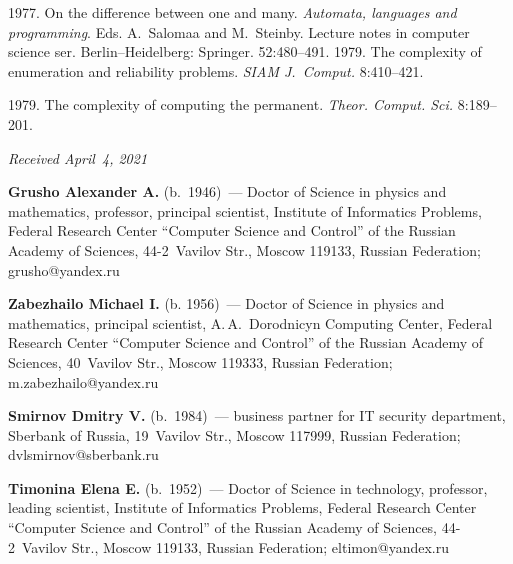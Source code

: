 \begin{multicols}{2}
{{\begin{thebibliography}{99}
\pagebreak


 1977. On the difference between one and many. \textit{Automata, 
languages and programming}. Eds. A.~Salomaa and M.~Steinby. Lecture notes in computer science 
ser. Berlin--Heidelberg: Springer. 52:480--491.
 1979. The complexity of enumeration and reliability problems. \textit{SIAM 
J.~Comput.} 8:410--421.

\vspace*{-2pt}

 1979. The complexity of computing the permanent. \textit{Theor. Comput. Sci.} 
8:189--201.

 \end{thebibliography}

 }
 }

\end{multicols}

\vspace*{-3pt}

  \hfill{\small\textit{Received April~4, 2021}}



   

\Contr

\noindent
\textbf{Grusho Alexander A.} (b.\ 1946)~--- Doctor of Science in physics and mathematics, 
professor, principal scientist, Institute of Informatics Problems, Federal Research Center 
``Computer Science and Control'' of the Russian Academy of Sciences, 44-2~Vavilov Str., 
Moscow 119133, Russian Federation; \mbox{grusho@yandex.ru}

\vspace*{3pt}

\noindent
\textbf{Zabezhailo Michael I.} (b. 1956)~--- Doctor of Science in physics and mathematics, principal 
scientist, A.\,A.~Dorodnicyn Computing Center, Federal Research Center 
``Computer Science and 
Control'' of the Russian Academy of Sciences, 40~Vavilov Str., Moscow 119333, Russian Federation; 
m.zabezhailo@yandex.ru

\vspace*{3pt}

\noindent
\textbf{Smirnov Dmitry V.} (b.\ 1984)~--- business partner for IT security department, Sberbank of 
Russia, 19~Vavilov Str., Moscow 117999, Russian Federation; \mbox{dvlsmirnov@sberbank.ru}

\vspace*{3pt}

\noindent
\textbf{Timonina Elena E.} (b.\ 1952)~--- Doctor of Science in technology, professor, leading 
scientist, Institute of Informatics Problems, Federal Research Center ``Computer Science and 
Control'' of the Russian Academy of Sciences, 44-2~Vavilov Str., Moscow 119133, Russian 
Federation; \mbox{eltimon@yandex.ru}


\label{end\stat}

\renewcommand{\bibname}{\protect\rm Литература}